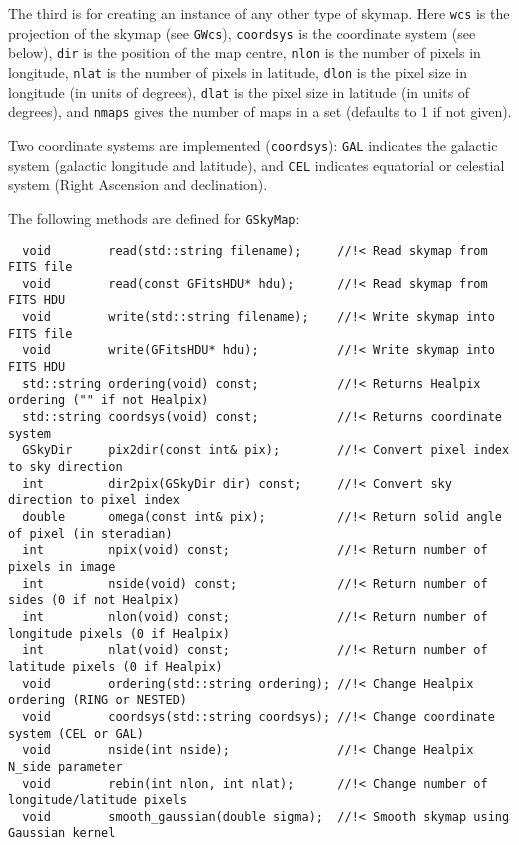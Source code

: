 \documentclass{article}[12pt,a4]
\begin{document}
The third is for creating an instance of any other type of skymap.
Here
{\tt wcs} is the projection of the skymap (see {\tt GWcs}),
{\tt coordsys} is the coordinate system (see below),
{\tt dir} is the position of the map centre,
{\tt nlon} is the number of pixels in longitude,
{\tt nlat} is the number of pixels in latitude,
{\tt dlon} is the pixel size in longitude (in units of degrees),
{\tt dlat} is the pixel size in latitude (in units of degrees),
and
{\tt nmaps} gives the number of maps in a set (defaults to 1 if not given).

Two coordinate systems are implemented ({\tt coordsys}):
{\tt GAL} indicates the galactic system (galactic longitude and latitude), and
{\tt CEL} indicates equatorial or celestial system (Right Ascension and declination).

The following methods are defined for {\tt GSkyMap}:
\begin{verbatim}
  void        read(std::string filename);     //!< Read skymap from FITS file
  void        read(const GFitsHDU* hdu);      //!< Read skymap from FITS HDU
  void        write(std::string filename);    //!< Write skymap into FITS file
  void        write(GFitsHDU* hdu);           //!< Write skymap into FITS HDU
  std::string ordering(void) const;           //!< Returns Healpix ordering ("" if not Healpix)
  std::string coordsys(void) const;           //!< Returns coordinate system
  GSkyDir     pix2dir(const int& pix);        //!< Convert pixel index to sky direction
  int         dir2pix(GSkyDir dir) const;     //!< Convert sky direction to pixel index
  double      omega(const int& pix);          //!< Return solid angle of pixel (in steradian)
  int         npix(void) const;               //!< Return number of pixels in image
  int         nside(void) const;              //!< Return number of sides (0 if not Healpix)
  int         nlon(void) const;               //!< Return number of longitude pixels (0 if Healpix)
  int         nlat(void) const;               //!< Return number of latitude pixels (0 if Healpix)
  void        ordering(std::string ordering); //!< Change Healpix ordering (RING or NESTED)
  void        coordsys(std::string coordsys); //!< Change coordinate system (CEL or GAL)
  void        nside(int nside);               //!< Change Healpix N_side parameter
  void        rebin(int nlon, int nlat);      //!< Change number of longitude/latitude pixels
  void        smooth_gaussian(double sigma);  //!< Smooth skymap using Gaussian kernel
\end{verbatim}
\end{document}
